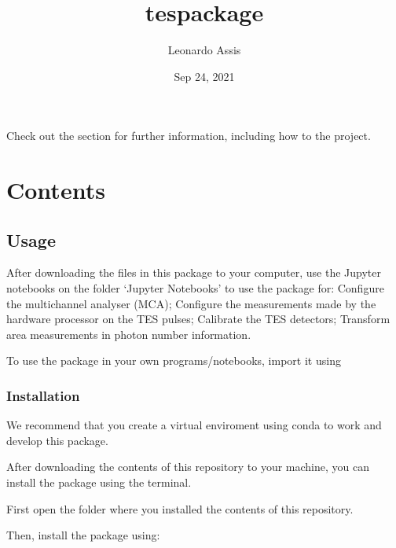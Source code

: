\documentclass[letterpaper,10pt,english]{sphinxmanual}
\title{tespackage}
\date{Sep 24, 2021}
\author{Leonardo Assis}
\begin{document}
\pagestyle{empty}
\sphinxmaketitle
\pagestyle{plain}
\sphinxtableofcontents
\pagestyle{normal}
\label{\detokenize{index::doc}}


\sphinxAtStartPar
Check out the {\hyperref[\detokenize{usage::doc}]{}} section for further information, including how to
{\hyperref[\detokenize{usage:installation}]{}} the project.


\chapter{Contents}
\label{\detokenize{index:contents}}

\section{Usage}
\label{\detokenize{usage:usage}}\label{\detokenize{usage::doc}}
\sphinxAtStartPar
After downloading the files in this package to your computer, use the Jupyter notebooks on the folder ‘Jupyter Notebooks’ to use the package for:
\sphinxhyphen{} Configure the multi\sphinxhyphen{}channel analyser (MCA);
\sphinxhyphen{} Configure the measurements made by the hardware processor on the TES pulses;
\sphinxhyphen{} Calibrate the TES detectors;
\sphinxhyphen{} Transform area measurements in photon number information.

\sphinxAtStartPar
To use the package in your own programs/notebooks, import it using

\begin{sphinxVerbatim}[commandchars=\\\{\}]
\end{sphinxVerbatim}


\subsection{Installation}
\label{\detokenize{usage:installation}}\label{\detokenize{usage:id1}}
\sphinxAtStartPar
We recommend that you create a virtual enviroment using conda to work and develop this package.

\sphinxAtStartPar
After downloading the contents of this repository to your machine, you can install the package using the terminal.

\sphinxAtStartPar
First open the folder where you installed the contents of this repository.

\sphinxAtStartPar
Then, install the package using:
\end{document}
